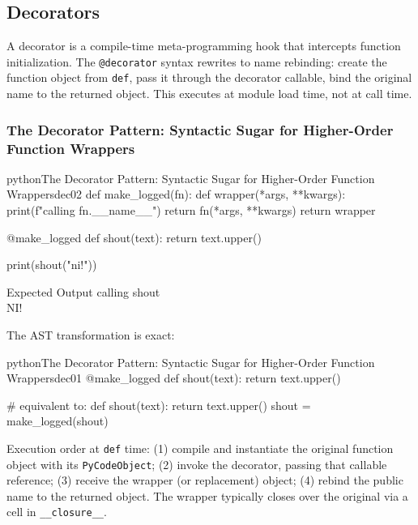\subsection{Decorators}

A decorator is a compile-time meta-programming hook that intercepts function initialization. The \texttt{@decorator} syntax rewrites to name rebinding: create the function object from \texttt{def}, pass it through the decorator callable, bind the original name to the returned object. This executes at module load time, not at call time.

\subsubsection{The Decorator Pattern: Syntactic Sugar for Higher-Order Function Wrappers}

\begin{codebox}[]{python}{The Decorator Pattern: Syntactic Sugar for Higher-Order Function Wrappers}{dec02}
def make_logged(fn):
    def wrapper(*args, **kwargs):
        print(f"calling {fn.__name__}")
        return fn(*args, **kwargs)
    return wrapper

@make_logged
def shout(text):
    return text.upper()

print(shout("ni!"))
\end{codebox}


\begin{iobox}{Expected Output}
calling shout \\
NI! \\
\end{iobox}




The AST transformation is exact:

\begin{codebox}[]{python}{The Decorator Pattern: Syntactic Sugar for Higher-Order Function Wrappers}{dec01}
@make_logged
def shout(text):
    return text.upper()

# equivalent to:
def shout(text):
    return text.upper()
shout = make_logged(shout)
\end{codebox}


Execution order at \texttt{def} time: (1) compile and instantiate the original function object with its \texttt{PyCodeObject}; (2) invoke the decorator, passing that callable reference; (3) receive the wrapper (or replacement) object; (4) rebind the public name to the returned object. The wrapper typically closes over the original via a cell in \texttt{\_\_closure\_\_}.

